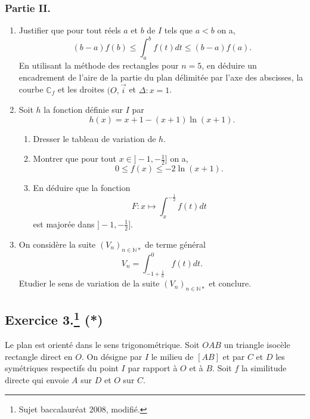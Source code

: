 \documentclass[a4paper]{article}
\begin{document}
\subsubsection*{Partie II.}
\begin{enumerate}
	\item Justifier que pour tout réels $a$ et $b$ de $I$ tels que $a<b$ on a, \[
			(b-a)f(b)\leq\int_a^bf(t)dt\leq(b-a)f(a)
	.\] 
	En utilisant la méthode des rectangles pour $n=5$, en déduire un encadrement de l'aire de la partie du plan délimitée par l'axe des abscisses, la courbe $\mathbb{C}_f$ et les droites $(O,\vec{i}$ et $\Delta:x=1$.\\
	\item Soit $h$ la fonction définie sur $I$ par \[
			h(x)=x+1-(x+1)\ln(x+1)
	.\] 
	\begin{enumerate}[label=(\alph*)]
		\item Dresser le tableau de variation de $h$.
		\item Montrer que pour tout $x\in]-1,-\frac{1}{2}]$ on a, \[
				0\leq f(x)\leq-2\ln(x+1)
		.\] 
	\item En déduire que la fonction \[
			F:x\mapsto\int_x^{-\frac{1}{2}}f(t)dt\] 
			est majorée dans $]-1,-\frac{1}{2}]$.
	\end{enumerate}
\item	On considère la suite $(V_n)_{n\in\mathbb{N}*}$ de terme général \[
		V_n=\int_{-1+\frac{1}{n}}^0f(t)dt
.\] 
Etudier le sens de variation de la suite $(V_n)_{n\in\mathbb{N}*}$ et conclure.
\end{enumerate}
\newpage
\subsection*{Exercice 3.\footnote{Sujet baccalauréat 2008, modifié.} (*)}
Le plan est orienté dans le sens trigonométrique. Soit $OAB$ un triangle isocèle rectangle direct en $O$. On désigne par $I$ le milieu de $[AB]$ et par $C$ et $D$ les symétriques respectifs du point $I$ par rapport à $O$ et à $B$. Soit $f$ la similitude directe qui envoie $A$ sur $D$ et $O$ sur $C$.
\end{document}

